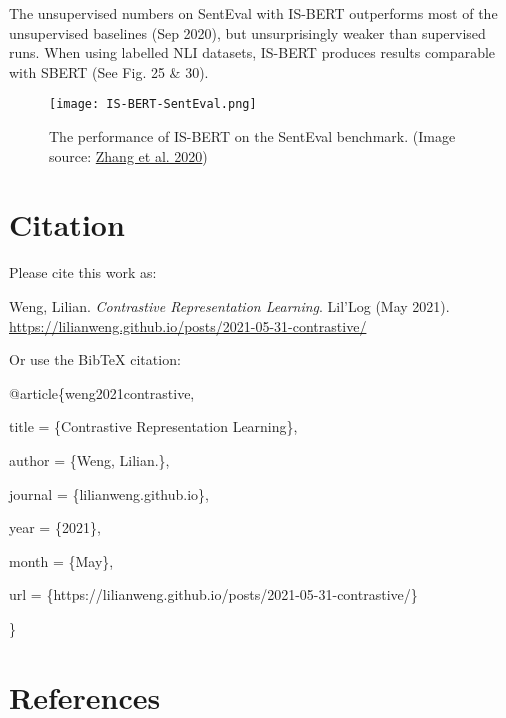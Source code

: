 \documentclass[12pt]{article}
\begin{document}
The unsupervised numbers on SentEval with IS-BERT outperforms most of the unsupervised baselines (Sep 2020), but unsurprisingly weaker than supervised runs. When using labelled NLI datasets, IS-BERT produces results comparable with SBERT (See Fig. 25 \& 30).

\begin{figure}[H]
    \centering
    \texttt{[image: IS-BERT-SentEval.png]}
    \caption{The performance of IS-BERT on the SentEval benchmark. (Image source: \href{https://arxiv.org/abs/2009.12061}{Zhang et al. 2020})}
\end{figure}

\section{Citation}
Please cite this work as:

\begin{tcolorbox}[colback=black!5!white, colframe=black!80!white, boxrule=0.5pt, arc=2mm, left=1mm, right=1mm, top=1mm, bottom=1mm]
  Weng, Lilian. \textit{Contrastive Representation Learning}. Lil'Log (May 2021). \url{https://lilianweng.github.io/posts/2021-05-31-contrastive/}
\end{tcolorbox}

Or use the Bib\TeX{} citation:

\begin{tcolorbox}[
    colback=black!5!white,
    colframe=black!80!white,
    boxrule=0.5pt,
    arc=2mm,
    left=1mm,
    right=1mm,
    top=1mm,
    bottom=1mm,
    listing only,
    listing options={
      basicstyle=\ttfamily\footnotesize,
      breaklines=true,
      literate={\{}{{\char`\{}}1 {\}}{{\char`\}}}1
    }
  ]

@article\{weng2021contrastive,

  title   = \{Contrastive Representation Learning\},

  author  = \{Weng, Lilian.\},

  journal = \{lilianweng.github.io\},

  year    = \{2021\},

  month   = \{May\},

  url     = \{https://lilianweng.github.io/posts/2021-05-31-contrastive/\}

\}
\end{tcolorbox}

\section{References}
\end{document}

